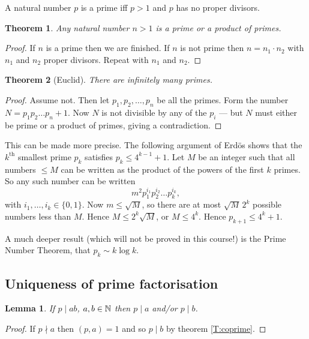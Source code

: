 \documentclass{notes}
\theoremstyle{plain}
\newtheorem{theorem}{Theorem}[chapter]
\newtheorem{lemma}{Lemma}[chapter]
\begin{document}
A natural number $p$ is a prime iff $p > 1$ and $p$ has no proper divisors.

\begin{theorem}\label{T:primprod}
Any natural number $n > 1$ is a prime or a product of primes.
\end{theorem}

\begin{proof}
If $n$ is a prime then we are finished.  If $n$ is not
prime then $n = n_1 \cdot n_2$ with $n_1$ and $n_2$ proper divisors.  Repeat
with $n_1$ and $n_2$.
\end{proof}

\begin{theorem}[Euclid]
There are infinitely many primes.
\end{theorem}

\begin{proof}
Assume not.  Then let $p_1, p_2, \dots, p_n$ be all the primes.
Form the number $N = p_1 p_2 \dots p_n + 1$.  Now $N$ is not divisible
by any of the $p_i$ --- but $N$ must either be prime or a product of
primes, giving a contradiction.
\end{proof}

This can be made more precise.  The following argument of Erd\"os
shows that the $k^{\text{th}}$ smallest prime $p_k$ satisfies
$p_k \le 4^{k-1} + 1$.  Let $M$ be an integer such that all numbers
$\le M$ can be written as the product of the powers of the
first $k$ primes.  So any such number can be written
\[
m^2 p_1^{i_1} p_2^{i_2} \dots p_k^{i_k},
\]
with $i_1, \dots, i_k \in \{ 0, 1\}$.  Now $m \le \sqrt{M}$, so there
are at most $\sqrt{M}\, 2^k$ possible numbers less than $M$.  Hence
$M \le 2^k \sqrt{M}$, or $M \le 4^k$.  Hence $p_{k+1} \le 4^k + 1$.

A much deeper result (which will not be proved in this course!) is
the Prime Number Theorem, that $p_k \sim k \log k$.

\subsection{Uniqueness of prime factorisation}

\begin{lemma}
If $p \mid a b$, $a,b \in \mathbb{N}$ then $p \mid a$ and/or $p \mid b$.
\end{lemma}

\begin{proof}
If $p \nmid a$ then $(p,a) = 1$ and so $p \mid b$ by theorem \eqref{T:coprime}.
\end{proof}
\end{document}
